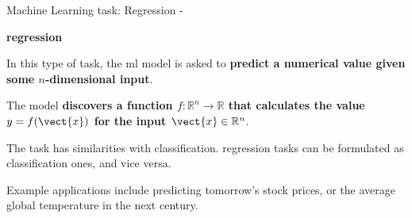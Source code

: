 

\begin{frame}[t,allowframebreaks]{
    Machine Learning task: Regression - }

    {\bf {}\Gls{regression}} \\
    \vspace{0.1cm}
    \begin{itemize}
        {
            \item
            In this type of task, the \gls{ml} model 
            is asked to {\bf predict a numerical value given 
            some $n$-dimensional input}.
            \begin{itemize}
                {\scriptsize
                \item        
                The model {\bf discovers a function 
                $f: \mathbb{R}^n \rightarrow \mathbb{R}$
                that calculates the value $y = f(\vect{x})$ 
                for the input $\vect{x} \in \mathbb{R}^n$}.\\
                }
            \end{itemize}
            \vspace{0.1cm}
            \item
            The task has similarities with 
            \gls{classification}. 
            \Gls{regression} tasks can be formulated 
            as \gls{classification} ones, and vice versa.\\
            \vspace{0.1cm}
            \item
            Example applications include 
            predicting tomorrow's stock prices, 
            or the average global temperature in the next century.
        }
    \end{itemize}

\end{frame}